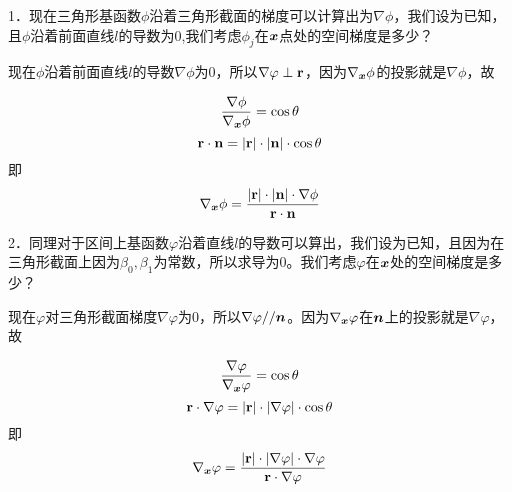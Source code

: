 \documentclass{article}
\begin{document}
1．现在三角形基函数$\phi$沿着三角形截面的梯度可以计算出为$\nabla \phi $，我们设为已知，且$\phi$沿着前面直线$l$的导数为$0$,我们考虑$\phi_j$在$\boldsymbol x$点处的空间梯度是多少？

现在$\phi$沿着前面直线$l$的导数$\nabla \phi$为$0$，所以$\nabla \varphi \perp \bf r$，因为$\nabla _{\boldsymbol x} \phi$的投影就是$\nabla \phi$，故

$$\frac{\nabla \phi}{\nabla _{\boldsymbol x} \phi}=\cos \theta$$
$$\bf r \cdot \boldsymbol n=|\bf r|\cdot |\boldsymbol n|\cdot \cos \theta$$
即
$$\nabla _{\boldsymbol x}\phi=\frac{|\bf r|\cdot|\boldsymbol n| \cdot \nabla \phi}{\bf r \cdot \boldsymbol n }$$







2．同理对于区间上基函数$\varphi$沿着直线$l$的导数可以算出，我们设为已知，且因为在三角形截面上因为$\beta_0,\beta_1$为常数，所以求导为$0$。我们考虑$\varphi$在$\boldsymbol x$处的空间梯度是多少？

现在$\varphi$对三角形截面梯度$\nabla \varphi$为$0$，所以$\nabla \varphi // \boldsymbol n$。因为$\nabla _{\boldsymbol x} \varphi$在$\boldsymbol n$上的投影就是$\nabla \varphi$，故

$$\frac{\nabla \varphi}{\nabla _{\boldsymbol x} \varphi}=\cos \theta$$
$$\bf r \cdot \nabla \varphi = |\bf r| \cdot|\nabla \varphi|\cdot \cos \theta$$
即
$$\nabla _{\boldsymbol x} \varphi=\frac{|\bf r| \cdot|\nabla \varphi| \cdot \nabla \varphi}{\bf r \cdot \nabla \varphi}$$












\cite{sheng2008}


\end{document}
